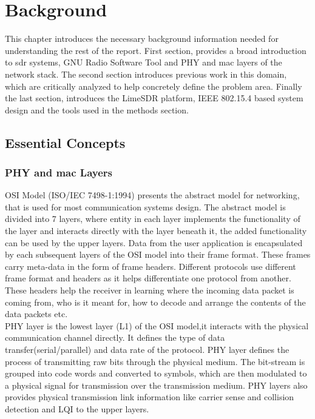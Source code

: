 \chapter{Background}
This chapter introduces the necessary background information needed for understanding the rest of the report.
First section, provides a broad introduction to \ac{sdr} systems, GNU Radio Software Tool and \ac{PHY} and \ac{mac} layers of the network stack.
The second section introduces previous work in this domain, which are critically analyzed to help concretely define the problem area.
Finally the last section, introduces the LimeSDR platform, IEEE 802.15.4 based system design and the tools used in the methods section.


\section{Essential Concepts}
\subsection{\ac{PHY} and \ac{mac} Layers}
\ac{OSI} Model (ISO/IEC 7498-1:1994) presents the abstract model for networking, that is used for most communication systems design.
The abstract model is divided into 7 layers,  where entity in each layer implements the functionality of the layer and interacts directly with the layer beneath it, the added functionality can be used by the upper layers.
Data from the user application is encapsulated by each subsequent layers of the \ac{OSI} model into their frame format.
These frames carry meta-data in the form of frame headers.
Different protocols use different frame format and headers  as it helps differentiate one protocol from another.
These headers help the receiver in learning where the incoming data packet is coming from, who is it meant for, how to decode and arrange the contents of the data packets etc.\\

\ac{PHY} layer is the lowest layer (L1) of the \ac{OSI} model,it interacts with the physical communication channel directly.
It defines the type of data transfer(serial/parallel) and data rate of the protocol.
\ac{PHY} layer defines the process of transmitting raw bits through the physical medium.
The bit-stream is grouped into code words and converted to symbols, which are then modulated to a physical signal for transmission over the transmission medium.
\ac{PHY} layers also provides physical transmission link information like carrier sense and collision detection and \ac{LQI}  to the upper layers. \\


